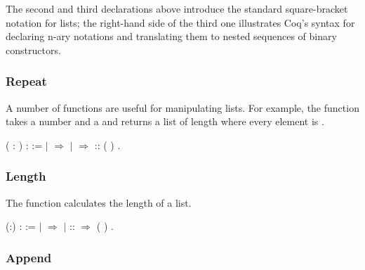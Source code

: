 \documentclass[12pt]{report}
\begin{document}
   The second and third  declarations above introduce the
   standard square-bracket notation for lists; the right-hand side of
   the third one illustrates Coq's syntax for declaring n-ary
   notations and translating them to nested sequences of binary
   constructors. 

\subsubsection{Repeat}

 A number of functions are useful for manipulating lists.
    For example, the  function takes a number  and a
     and returns a list of length  where every element
    is . \begin{coqdoccode}
\coqdocemptyline
\coqdocnoindent
{}  (  : ) :  := \coqdoceol
\coqdocindent{1.00em}
  \coqdoceol
\coqdocindent{1.00em}
\ensuremath{|}  \ensuremath{\Rightarrow} \coqdoceol
\coqdocindent{1.00em}
\ensuremath{|}   \ensuremath{\Rightarrow}  :: (  )\coqdoceol
\coqdocindent{1.00em}
.\coqdoceol
\coqdocemptyline
\end{coqdoccode}
\subsubsection{Length}

 The  function calculates the length of a list. \begin{coqdoccode}
\coqdocemptyline
\coqdocnoindent
{}  (:) :  := \coqdoceol
\coqdocindent{1.00em}
  \coqdoceol
\coqdocindent{1.00em}
\ensuremath{|}  \ensuremath{\Rightarrow} \coqdoceol
\coqdocindent{1.00em}
\ensuremath{|}  ::  \ensuremath{\Rightarrow}  ( )\coqdoceol
\coqdocindent{1.00em}
.\coqdoceol
\coqdocemptyline
\end{coqdoccode}
\subsubsection{Append}
\end{document}
